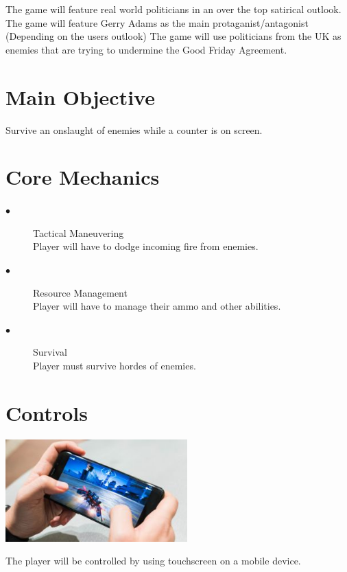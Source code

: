 \documentclass[a4paper]{scrreprt}
\begin{document}
    The game will feature real world politicians in an over the top satirical outlook.
    The game will feature Gerry Adams as the main protaganist/antagonist (Depending on the users outlook)
    The game will use politicians from the UK as enemies that are trying to undermine the Good Friday Agreement.

    \section{Main Objective}

    Survive an onslaught of enemies while a counter is on screen.

    \section{Core Mechanics}

    \begin{description}
        \item[$\bullet$] Tactical Maneuvering \\
        Player will have to dodge incoming fire from enemies.
        \item[$\bullet$] Resource Management \\
        Player will have to manage their ammo and other abilities.
        \item[$\bullet$] Survival \\
        Player must survive hordes of enemies.
    \end{description}

    \section{Controls}

    \begin{center}
        \includegraphics[width=7cm]{mobile}
    \end{center}

    The player will be controlled by using touchscreen on a mobile device.

\end{document}
